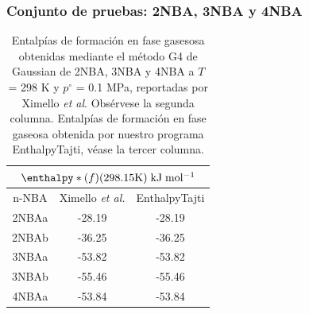 \documentclass{beamer}
\begin{document}

\begin{frame}
\frametitle{Conjunto de pruebas: 2NBA, 3NBA y 4NBA}

\begin{table}[H]
\centering
\begin{tabular}{|c|c|c|}
\hline
	\multicolumn{3}{||c||}{$\enthalpy*(f){}(298.15 \mathrm{K})\; \mathrm{kJ\;mol^{-1}}$}\\
\hline
\hline
	n-NBA & Ximello \textit{et al.} & EnthalpyTajti\\ 
\hline 
2NBAa & -28.19 & -28.19\\
\hline
2NBAb & -36.25 & -36.25\\ 
\hline 
3NBAa & -53.82 & -53.82\\
\hline
3NBAb & -55.46 & -55.46\\ 
\hline 
4NBAa & -53.84 & -53.84\\ 
\hline  
\end{tabular} 
	\caption{Entalpías de formación en fase gasesosa obtenidas mediante el método G4 de Gaussian de 2NBA, 3NBA y 4NBA a $T$ = 298 K y $p^{\circ}$ = 0.1 MPa, reportadas por Ximello \textit{et al}. Obsérvese la segunda columna. Entalpías de formación en fase gaseosa obtenida por nuestro programa EnthalpyTajti, véase la tercer columna.}
\label{Ximello-table-1}
\end{table}
\end{frame}
\end{document}
